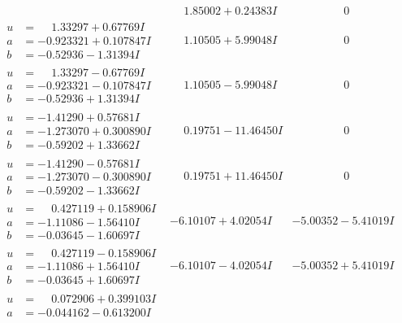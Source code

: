 \documentclass[1p]{elsarticle_modified}
\theoremstyle{definition}
\begin{document}
$$\begin{array}{c|c|c}
 & \phantom{-}1.85002 + 0.24383 I & \phantom{-0.000000 } 0 \\ \hline\begin{aligned}
u &= \phantom{-}1.33297 + 0.67769 I \\
a &= -0.923321 + 0.107847 I \\
b &= -0.52936 - 1.31394 I\end{aligned}
 & \phantom{-}1.10505 + 5.99048 I & \phantom{-0.000000 } 0 \\ \hline\begin{aligned}
u &= \phantom{-}1.33297 - 0.67769 I \\
a &= -0.923321 - 0.107847 I \\
b &= -0.52936 + 1.31394 I\end{aligned}
 & \phantom{-}1.10505 - 5.99048 I & \phantom{-0.000000 } 0 \\ \hline\begin{aligned}
u &= -1.41290 + 0.57681 I \\
a &= -1.273070 + 0.300890 I \\
b &= -0.59202 + 1.33662 I\end{aligned}
 & \phantom{-}0.19751 - 11.46450 I & \phantom{-0.000000 } 0 \\ \hline\begin{aligned}
u &= -1.41290 - 0.57681 I \\
a &= -1.273070 - 0.300890 I \\
b &= -0.59202 - 1.33662 I\end{aligned}
 & \phantom{-}0.19751 + 11.46450 I & \phantom{-0.000000 } 0 \\ \hline\begin{aligned}
u &= \phantom{-}0.427119 + 0.158906 I \\
a &= -1.11086 - 1.56410 I \\
b &= -0.03645 - 1.60697 I\end{aligned}
 & -6.10107 + 4.02054 I & -5.00352 - 5.41019 I \\ \hline\begin{aligned}
u &= \phantom{-}0.427119 - 0.158906 I \\
a &= -1.11086 + 1.56410 I \\
b &= -0.03645 + 1.60697 I\end{aligned}
 & -6.10107 - 4.02054 I & -5.00352 + 5.41019 I \\ \hline\begin{aligned}
u &= \phantom{-}0.072906 + 0.399103 I \\
a &= -0.044162 - 0.613200 I \\

\end{aligned}
\end{array}$$
\end{document}
